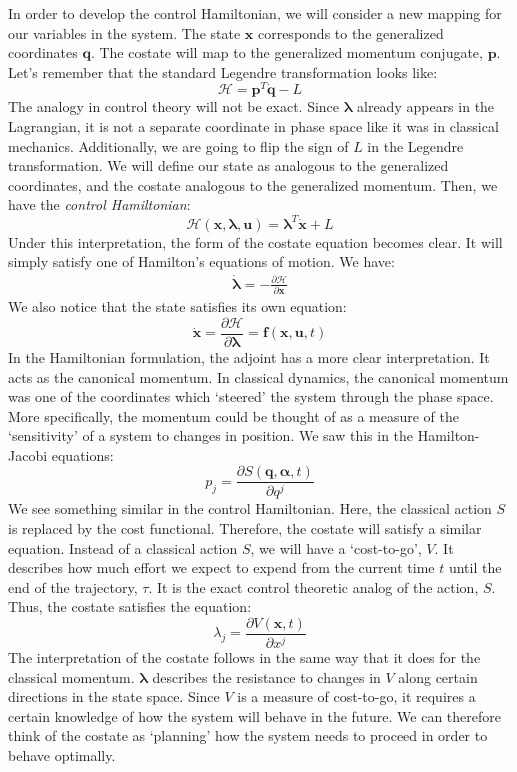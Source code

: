 In order to develop the control \gls{Hamiltonian}, we will consider a new mapping for our variables in the system. The state $\bm{x}$ corresponds to the generalized coordinates $\bm{q}$. The costate will map to the generalized momentum conjugate, $\bm{p}$. Let's remember that the standard Legendre transformation looks like:
$$\mathcal{H}=\bm{p}^T\bm{\dot{q}}-L$$
The analogy in control theory will not be exact. Since $\bm{\lambda}$ already appears in the \gls{Lagrangian}, it is not a separate coordinate in phase space like it was in classical mechanics. Additionally, we are going to flip the sign of $L$ in the Legendre transformation. We will define our state as analogous to the generalized coordinates, and the costate analogous to the generalized momentum. Then, we have the \textit{control Hamiltonian}:
$$\mathcal{H}(\bm{x},\bm{\lambda},\bm{u})=\bm{\lambda}^T\bm{\dot{x}}+L$$
Under this interpretation, the form of the costate equation becomes clear. It will simply satisfy one of Hamilton's equations of motion. We have:
\begin{gather}
\bm{\dot{\lambda}}=-\frac{\partial \mathcal{H}}{\partial \bm{x}}
\end{gather}
We also notice that the state satisfies its own equation:
$$\bm{\dot{x}}=\frac{\partial \mathcal{H}}{\partial \bm{\lambda}}=\bm{f}(\bm{x},\bm{u},t)$$
In the \gls{Hamiltonian} formulation, the adjoint has a more clear interpretation. It acts as the canonical momentum. In classical dynamics, the canonical momentum was one of the coordinates which `steered' the system through the phase space. More specifically, the momentum could be thought of as a measure of the `sensitivity' of a system to changes in position. We saw this in the Hamilton-Jacobi equations:
$$p_j=\frac{\partial S(\bm{q},\bm{\alpha},t)}{\partial q^j}$$
We see something similar in the control \gls{Hamiltonian}. Here, the classical action $S$ is replaced by the cost functional. Therefore, the costate will satisfy a similar equation. Instead of a classical action $S$, we will have a `cost-to-go', $V$. It describes how much effort we expect to expend from the current time $t$ until the end of the trajectory, $\tau$. It is the exact control theoretic analog of the action, $S$. Thus, the costate satisfies the equation:
$$\lambda_j=\frac{\partial V(\bm{x},t)}{\partial x^j}$$
The interpretation of the costate follows in the same way that it does for the classical momentum. $\bm{\lambda}$ describes the resistance to changes in $V$ along certain directions in the state space. Since $V$ is a measure of cost-to-go, it requires a certain knowledge of how the system will behave in the future. We can therefore think of the costate as `planning' how the system needs to proceed in order to behave optimally.

